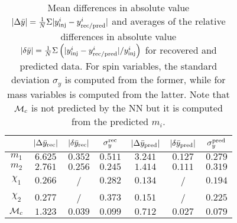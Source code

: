 
\begin{table}
  \caption{\label{GPR_errors}  Mean differences in absolute value 
    $|\Delta \bar{y}|=  \frac{1}{N} \Sigma |y^i_{\rm inj} - y^i_{\rm rec/pred}|$
    and averages of the relative differences in absolute value 
    $|\delta \bar{y}| = \frac{1}{N} \Sigma \left( |y^i_{\rm inj} - 
    y^i_{\rm rec/pred}|/y^i_{\rm inj} \right) $ for recovered and predicted data.
    For spin variables, the standard deviation $\sigma_y$ is computed from the 
    former, while for mass variables is computed from the latter. Note that 
    ${\cal{M}}_c$ is not predicted by the NN but it is computed from the 
    predicted $m_i$.}
  \begin{center}
  \begin{tabular}{c|ccc|ccc}
  \hline\hline
  & $|\Delta \bar{y}_{\rm rec}|$  & $|\delta \bar{y}_{\rm rec}|$  & $\sigma_y^{\rm rec}$ &
     $|\Delta \bar{y}_{\rm pred}|$ & $|\delta \bar{y}_{\rm pred}|$ & $\sigma_y^{\rm pred}$ \\
  \hline\hline
$m_1$          & $6.625$ & $0.352$ & $0.511$ & $3.241$ & $0.127$ & $0.279$ \\
$m_2$          & $2.761$ & $0.256$ & $0.245$ & $1.414$ & $0.111$ & $0.319$ \\
$\chi_1$       & $0.266$ &  /  & $0.282$ & $0.134$ &  /  & $0.194$ \\
$\chi_2$       & $0.277$ &  /  & $0.373$ & $0.151$ &  /  & $0.225$ \\
\hline
${\cal{M}}_c$  & $1.323$ & $0.039$ & $0.099$ & $0.712$ & $0.027$ & $0.079$ \\
  \hline\hline
  \end{tabular}
  \end{center}
\end{table}

